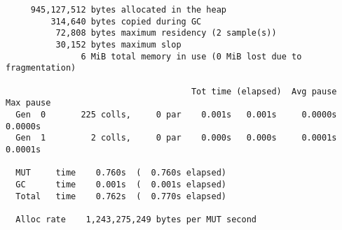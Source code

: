 \begin{verbatim}
     945,127,512 bytes allocated in the heap
         314,640 bytes copied during GC
          72,808 bytes maximum residency (2 sample(s))
          30,152 bytes maximum slop
               6 MiB total memory in use (0 MiB lost due to fragmentation)

                                     Tot time (elapsed)  Avg pause  Max pause
  Gen  0       225 colls,     0 par    0.001s   0.001s     0.0000s    0.0000s
  Gen  1         2 colls,     0 par    0.000s   0.000s     0.0001s    0.0001s

  MUT     time    0.760s  (  0.760s elapsed)
  GC      time    0.001s  (  0.001s elapsed)
  Total   time    0.762s  (  0.770s elapsed)

  Alloc rate    1,243,275,249 bytes per MUT second
\end{verbatim}
